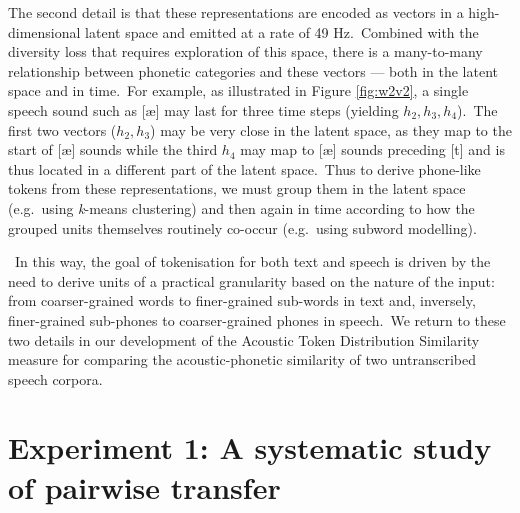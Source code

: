 \documentclass[main.tex]{subfiles}
\begin{document}
The second detail is that these representations are encoded as vectors in a high-dimensional latent space and emitted at a rate of 49 Hz.~Combined with the diversity loss that requires exploration of this space, there is a many-to-many relationship between phonetic categories and these vectors --- both in the latent space and in time.~For example, as illustrated in Figure \ref{fig:w2v2}, a single speech sound such as [\ae] may last for three time steps (yielding $h_2, h_3, h_4$).~The first two vectors ($h_2, h_3$) may be very close in the latent space, as they map to the start of [\ae] sounds while the third $h_4$ may map to [\ae] sounds preceding [t] and is thus located in a different part of the latent space.~Thus to derive phone-like tokens from these representations, we must group them in the latent space (e.g.~using \textit{k}-means clustering) and then again in time according to how the grouped units themselves routinely co-occur (e.g.~using subword modelling).

~In this way, the goal of tokenisation for both text and speech is driven by the need to derive units of a practical granularity based on the nature of the input: from coarser-grained words to finer-grained sub-words in text and, inversely, finer-grained sub-phones to coarser-grained phones in speech.~We return to these two details in our development of the Acoustic Token Distribution Similarity measure for comparing the acoustic-phonetic similarity of two untranscribed speech corpora.

\section{Experiment 1: A systematic study of pairwise transfer}
\label{sec:sigtyp:exp1}


\end{document}
